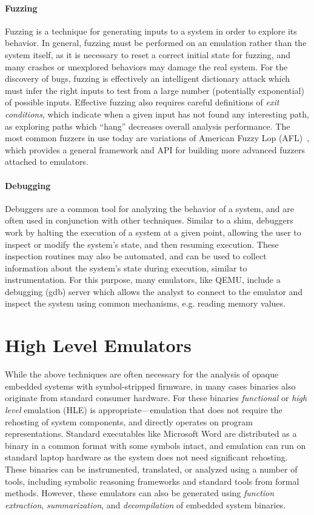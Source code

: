 \paragraph{Fuzzing} Fuzzing is a technique for generating inputs to a system in order to explore its behavior.
In general, fuzzing must be performed on an emulation rather than the system itself, as it is necessary to reset a correct initial state for fuzzing, and many crashes or unexplored behaviors may damage the real system.
For the discovery of bugs, fuzzing is effectively an intelligent dictionary attack which must infer the right inputs to test from a large number (potentially exponential) of possible inputs.
Effective fuzzing also requires careful definitions of \emph{exit conditions}, which indicate when a given input has not found any interesting path, as exploring paths which ``hang'' decreases overall analysis performance.
The most common fuzzers in use today are variations of American Fuzzy Lop (AFL)~\cite{zalewski2017technical}, which provides a general framework and API for building more advanced fuzzers attached to emulators.

\paragraph{Debugging} Debuggers are a common tool for analyzing the behavior of a system, and are often used in conjunction with other techniques.
Similar to a shim, debuggers work by halting the execution of a system at a given point, allowing the user to inspect or modify the system's state, and then resuming execution.
These inspection routines may also be automated, and can be used to collect information about the system's state during execution, similar to instrumentation.
For this purpose, many emulators, like QEMU, include a debugging (gdb) server which allows the analyst to connect to the emulator and inspect the system using common mechanisms, e.g. reading memory values.

\section{High Level Emulators}
\label{sec:highlevel}

While the above techniques are often necessary for the analysis of opaque embedded systems with symbol-stripped firmware, in many cases binaries also originate from standard consumer hardware.
For these binaries \emph{functional} or \emph{high level} emulation (HLE) is appropriate---emulation that does not require the rehosting of system components, and directly operates on program representations.
Standard executables like Microsoft Word are distributed as a binary in a common format with some symbols intact, and emulation can run on standard laptop hardware as the system does not need significant rehosting.
These binaries can be instrumented, translated, or analyzed using a number of tools, including symbolic reasoning frameworks and standard tools from formal methods.
However, these emulators can also be generated using \emph{function extraction}, \emph{summarization}, and \emph{decompilation} of embedded system binaries.

